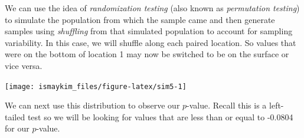 \documentclass[]{tufte-book}
\newenvironment{Shaded}{\begin{snugshade}}{\end{snugshade}}
\newcommand{\KeywordTok}[1]{\textcolor[rgb]{0.13,0.29,0.53}{\textbf{{#1}}}}
\newcommand{\DataTypeTok}[1]{\textcolor[rgb]{0.13,0.29,0.53}{{#1}}}
\newcommand{\DecValTok}[1]{\textcolor[rgb]{0.00,0.00,0.81}{{#1}}}
\newcommand{\StringTok}[1]{\textcolor[rgb]{0.31,0.60,0.02}{{#1}}}
\newcommand{\NormalTok}[1]{{#1}}
\begin{document}
We can use the idea of \emph{randomization testing} (also known as
\emph{permutation testing}) to simulate the population from which the
sample came and then generate samples using \emph{shuffling} from that
simulated population to account for sampling variability. In this case,
we will shuffle along each paired location. So values that were on the
bottom of location 1 may now be switched to be on the surface or vice
versa.

\begin{Shaded}
\end{Shaded}

\begin{center}\texttt{[image: ismaykim\_files/figure-latex/sim5-1]} \end{center}

We can next use this distribution to observe our \(p\)-value. Recall
this is a left-tailed test so we will be looking for values that are
less than or equal to -0.0804 for our \(p\)-value.

\begin{Shaded}
\end{Shaded}
\end{document}
